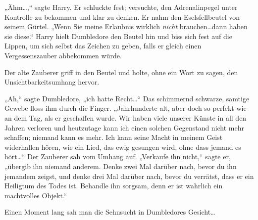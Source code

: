 „Ähm…,“ sagte Harry. Er schluckte fest; versuchte, den Adrenalinpegel unter Kontrolle zu bekommen und klar zu denken. Er nahm den Eselsfellbeutel von seinem Gürtel. „Wenn Sie meine Erlaubnis wirklich \emph{nicht} brauchen…dann haben sie diese.“ Harry hielt Dumbledore den Beutel hin und biss sich fest auf die Lippen, um sich selbst das Zeichen zu geben, falls er gleich einen Vergessenszauber abbekommen würde.

Der alte Zauberer griff in den Beutel und holte, ohne ein Wort zu sagen, den Unsichtbarkeitsumhang hervor.

„Ah,“ sagte Dumbledore, „ich hatte Recht…“ Das schimmernd schwarze, samtige Gewebe floss ihm durch die Finger. „Jahrhunderte alt, aber doch so perfekt wie an dem Tag, als er geschaffen wurde. Wir haben viele unserer Künste in all den Jahren verloren und heutzutage kann ich einen solchen Gegenstand nicht mehr schaffen; niemand kann es mehr. Ich kann seine Macht in meinem Geist widerhallen hören, wie ein Lied, das ewig gesungen wird, ohne dass jemand es hört…“ Der Zauberer sah vom Umhang auf. „Verkaufe ihn nicht,“ sagte er, „übergib ihn niemand anderem. Denke zwei Mal darüber nach, bevor du ihn jemandem zeigst, und denke drei Mal darüber nach, bevor du verrätst, dass er ein Heiligtum des Todes ist. Behandle ihn sorgsam, denn er ist wahrlich ein machtvolles Objekt.“

Einen Moment lang sah man die Sehnsucht in Dumbledores Gesicht…

